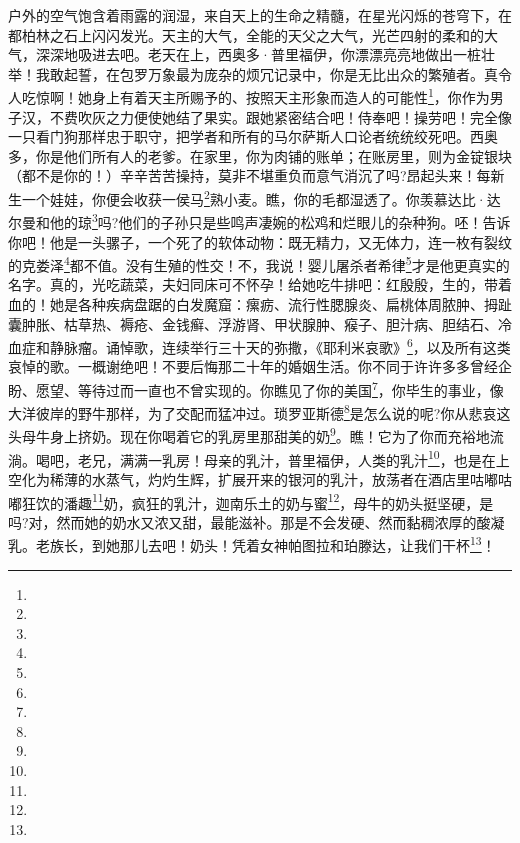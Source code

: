 \par 户外的空气饱含着雨露的润湿，来自天上的生命之精髓，在星光闪烁的苍穹下，在都柏林之石上闪闪发光。天主的大气，全能的天父之大气，光芒四射的柔和的大气，深深地吸进去吧。老天在上，西奥多·普里福伊，你漂漂亮亮地做出一桩壮举！我敢起誓，在包罗万象最为庞杂的烦冗记录中，你是无比出众的繁殖者。真令人吃惊啊！她身上有着天主所赐予的、按照天主形象而造人的可能性\footnote{}，你作为男子汉，不费吹灰之力便使她结了果实。跟她紧密结合吧！侍奉吧！操劳吧！完全像一只看门狗那样忠于职守，把学者和所有的马尔萨斯人口论者统统绞死吧。西奥多，你是他们所有人的老爹。在家里，你为肉铺的账单；在账房里，则为金锭银块（都不是你的！）辛辛苦苦操持，莫非不堪重负而意气消沉了吗?昂起头来！每新生一个娃娃，你便会收获一侯马\footnote{}熟小麦。瞧，你的毛都湿透了。你羡慕达比·达尔曼和他的琼\footnote{}吗?他们的子孙只是些鸣声凄婉的松鸡和烂眼儿的杂种狗。呸！告诉你吧！他是一头骡子，一个死了的软体动物：既无精力，又无体力，连一枚有裂纹的克娄泽\footnote{}都不值。没有生殖的性交！不，我说！婴儿屠杀者希律\footnote{}才是他更真实的名字。真的，光吃蔬菜，夫妇同床可不怀孕！给她吃牛排吧：红殷殷，生的，带着血的！她是各种疾病盘踞的白发魔窟：瘰疬、流行性腮腺炎、扁桃体周脓肿、拇趾囊肿胀、枯草热、褥疮、金钱癣、浮游肾、甲状腺肿、瘊子、胆汁病、胆结石、冷血症和静脉瘤。诵悼歌，连续举行三十天的弥撒，《耶利米哀歌》\footnote{}，以及所有这类哀悼的歌。一概谢绝吧！不要后悔那二十年的婚姻生活。你不同于许许多多曾经企盼、愿望、等待过而一直也不曾实现的。你瞧见了你的美国\footnote{}，你毕生的事业，像大洋彼岸的野牛那样，为了交配而猛冲过。琐罗亚斯德\footnote{}是怎么说的呢?你从悲哀这头母牛身上挤奶。现在你喝着它的乳房里那甜美的奶\footnote{}。瞧！它为了你而充裕地流淌。喝吧，老兄，满满一乳房！母亲的乳汁，普里福伊，人类的乳汁\footnote{}，也是在上空化为稀薄的水蒸气，灼灼生辉，扩展开来的银河的乳汁，放荡者在酒店里咕嘟咕嘟狂饮的潘趣\footnote{}奶，疯狂的乳汁，迦南乐土的奶与蜜\footnote{}，母牛的奶头挺坚硬，是吗?对，然而她的奶水又浓又甜，最能滋补。那是不会发硬、然而黏稠浓厚的酸凝乳。老族长，到她那儿去吧！奶头！凭着女神帕图拉和珀滕达，让我们干杯\footnote{}！
